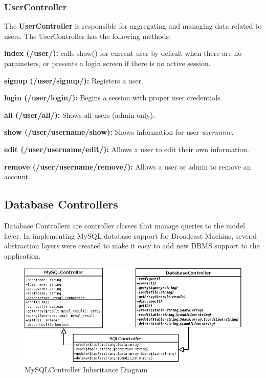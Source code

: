 \documentclass[a4paper,12pt]{report}
\begin{document}
\subsubsection{UserController}
The \textbf{UserController} is responsible for aggregating and managing data related to users. The UserController has the following methods:
\begin{description}
\item{\textbf{index (/user/): } calls show() for current user by default when there are no parameters, or presents a login screen if there is no active session.}
\item{\textbf{signup (/user/signup/): } Registers a user.}
\item{\textbf{login (/user/login/): } Begins a session with proper user credentials.}
\item{\textbf{all (/user/all/): } Shows all users (admin-only).}
\item{\textbf{show (/user/username/show): } Shows information for user \textit{username}.}
\item{\textbf{edit (/user/username/edit/): } Allows a user to edit their own information.}
\item{\textbf{remove (/user/username/remove/): } Allows a user or admin to remove an account.} \\
\end{description}

\subsection*{Database Controllers}
Database Controllers are controller classes that manage queries to the model layer. In implementing MySQL database support for Broadcast Machine, several abstraction layers were created to make it easy to add new DBMS support to the application.
\begin{figure}[htp]
\begin{center}
\includegraphics[scale=0.5]{./images/mysql.png}
\end{center}
\caption{MySQLController Inheritance Diagram}
\end{figure}
\end{document}
